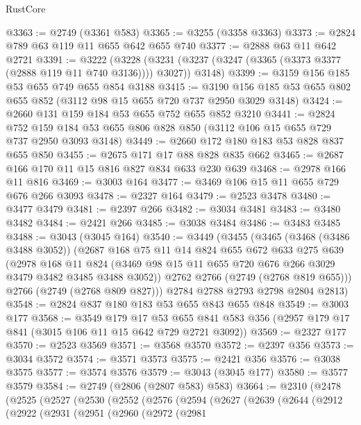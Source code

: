 \begin{lexlean}{RustCore}
\begin{coremodule}
@3363 := @2749 (@3361 @583)
@3365 := @3255 (@3358 @3363)
@3373 := @2824 @789 @63 @119 @11 @655 @642 @655 @740
@3377 := @2888 @63 @11 @642 @2721
@3391 := @3222
    (@3228 (@3231 (@3237 (@3247 (@3365 (@3373 @3377 (@2888 @119 @11 @740 @3136)))) @3027)) @3148)
@3399 := @3159 @156 @185 @53 @655 @749 @655 @854 @3188
@3415 := @3190 @156 @185 @53 @655 @802 @655 @852 (@3112 @98 @15 @655 @720 @737 @2950 @3029 @3148)
@3424 := @2660 @131 @159 @184 @53 @655 @752 @655 @852 @3210
@3441 := @2824
    @752
    @159
    @184
    @53
    @655
    @806
    @828
    @850
    (@3112 @106 @15 @655 @729 @737 @2950 @3093 @3148)
@3449 := @2660 @172 @180 @183 @53 @828 @837 @655 @850
@3455 := @2675 @171 @17 @88 @828 @835 @662
@3465 := @2687 @166 @170 @11 @15 @816 @827 @834 @633 @230 @639
@3468 := @2978 @166 @11 @816
@3469 := @3003 @164
@3477 := @3469 @106 @15 @11 @655 @729 @676 @266 @3093
@3478 := @2327 @164
@3479 := @2523 @3478
@3480 := @3477 @3479
@3481 := @2397 @266
@3482 := @3034 @3481
@3483 := @3480 @3482
@3484 := @2421 @266
@3485 := @3038 @3484
@3486 := @3483 @3485
@3488 := @3043 (@3045 @164)
@3540 := @3449
    (@3455
      (@3465
        (@3468 (@3486 @3488 @3052))
        (@2687
          @168
          @75
          @11
          @14
          @824
          @655
          @672
          @633
          @275
          @639
          (@2978
            @168
            @11
            @824
            (@3469 @98 @15 @11 @655 @720 @676 @266 @3029 @3479 @3482 @3485 @3488 @3052))
          @2762
          @2766
          (@2749 (@2768 @819 @655)))
        @2766
        (@2749 (@2768 @809 @827)))
      @2784
      @2788
      @2793
      @2798
      @2804
      @2813)
@3548 := @2824 @837 @180 @183 @53 @655 @843 @655 @848
@3549 := @3003 @177
@3568 := @3549
    @179
    @17
    @53
    @655
    @841
    @583
    @356
    (@2957 @179 @17 @841 (@3015 @106 @11 @15 @642 @729 @2721 @3092))
@3569 := @2327 @177
@3570 := @2523 @3569
@3571 := @3568 @3570
@3572 := @2397 @356
@3573 := @3034 @3572
@3574 := @3571 @3573
@3575 := @2421 @356
@3576 := @3038 @3575
@3577 := @3574 @3576
@3579 := @3043 (@3045 @177)
@3580 := @3577 @3579
@3584 := @2749 (@2806 (@2807 @583) @583)
@3664 := @2310
    (@2478
      (@2525
        (@2527
          (@2530
            (@2552
              (@2576
                (@2594
                  (@2627
                    (@2639
                      (@2644
                        (@2912
                          (@2922
                            (@2931
                              (@2951
                                (@2960
                                  (@2972
                                    (@2981

\end{coremodule}
\end{lexlean}
